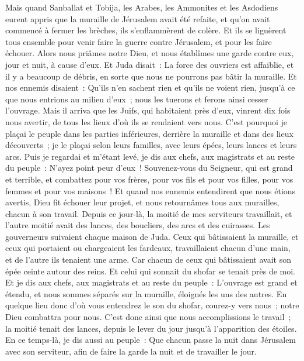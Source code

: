 \begin{multicols}{2}
Mais quand Sanballat et Tobija, les Arabes, les Ammonites et les Asdodiens eurent appris que la muraille de Jérusalem avait été refaite, et qu'on avait commencé à fermer les brèches, ils s'enflammèrent de colère.
Et ils se liguèrent tous ensemble pour venir faire la guerre contre Jérusalem, et pour les faire échouer.
Alors nous priâmes notre Dieu, et nous établîmes une garde contre eux, jour et nuit, à cause d'eux.
Et Juda disait~: La force des ouvriers est affaiblie, et il y a beaucoup de débris, en sorte que nous ne pourrons pas bâtir la muraille.
Et nos ennemis disaient~: Qu'ils n'en sachent rien et qu'ils ne voient rien, jusqu'à ce que nous entrions au milieu d'eux~; nous les tuerons et ferons ainsi cesser l'ouvrage.
Mais il arriva que les Juifs, qui habitaient près d'eux, vinrent dix fois nous avertir, de tous les lieux d'où ils se rendaient vers nous.
C’est pourquoi je plaçai le peuple dans les parties inférieures, derrière la muraille et dans des lieux découverts~; je le plaçai selon leurs familles, avec leurs épées, leurs lances et leurs arcs.
Puis je regardai et m'étant levé, je dis aux chefs, aux magistrats et au reste du peuple~: N'ayez point peur d'eux~! Souvenez-vous du Seigneur, qui est grand et terrible, et combattez pour vos frères, pour vos fils et pour vos filles, pour vos femmes et pour vos maisons~!
Et quand nos ennemis entendirent que nous étions avertis, Dieu fit échouer leur projet, et nous retournâmes tous aux murailles, chacun à son travail.
Depuis ce jour-là, la moitié de mes serviteurs travaillait, et l'autre moitié avait des lances, des boucliers, des arcs et des cuirasses. Les gouverneurs suivaient chaque maison de Juda.
Ceux qui bâtissaient la muraille, et ceux qui portaient ou chargeaient les fardeaux, travaillaient chacun d'une main, et de l'autre ils tenaient une arme.
Car chacun de ceux qui bâtissaient avait son épée ceinte autour des reins. Et celui qui sonnait du shofar se tenait près de moi.
Et je dis aux chefs, aux magistrats et au reste du peuple~: L'ouvrage est grand et étendu, et nous sommes séparés sur la muraille, éloignés les uns des autres.
En quelque lieu donc d'où vous entendrez le son du shofar, courez-y vers nous~; notre Dieu combattra pour nous.
C'est donc ainsi que nous accomplissions le travail~; la moitié tenait des lances, depuis le lever du jour jusqu'à l'apparition des étoiles.
En ce temps-là, je dis aussi au peuple~: Que chacun passe la nuit dans Jérusalem avec son serviteur, afin de faire la garde la nuit et de travailler le jour.

\end{multicols}
